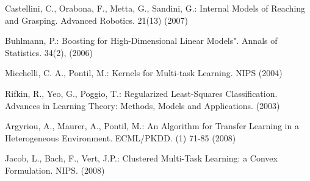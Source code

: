\begin{thebibliography}{4}
 Castellini, C., Orabona, F., Metta, G., Sandini, G.: Internal Models of Reaching and Grasping. Advanced Robotics. 21(13) (2007)



 Buhlmann, P.: Boosting for High-Dimensional Linear Models". Annals of Statistics. 34(2),  (2006)

 Micchelli, C. A., Pontil, M.: Kernels for Multi-task Learning. NIPS (2004)

 Rifkin, R., Yeo, G., Poggio, T.: Regularized Least-Squares Classification. Advances in Learning Theory: Methods, Models and Applications. (2003) 

 Argyriou, A., Maurer, A., Pontil, M.: An Algorithm for Transfer Learning in a Heterogeneous Environment. ECML/PKDD. (1) 71-85 (2008) 

 Jacob, L., Bach, F., Vert, J.P.: Clustered Multi-Task Learning: a Convex Formulation. NIPS. (2008) 

\end{thebibliography}